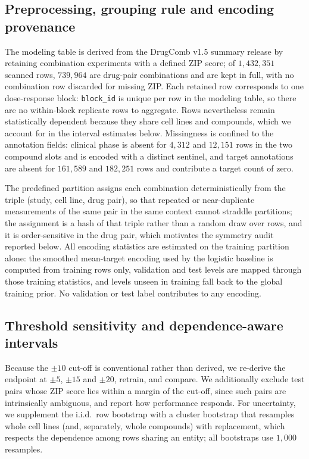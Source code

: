 \documentclass{bmcart}
\begin{document}
\subsection*{Preprocessing, grouping rule and encoding provenance}
The modeling table is derived from the DrugComb v1.5 summary release by retaining combination
experiments with a defined ZIP score; of $1{,}432{,}351$ scanned rows, $739{,}964$ are drug-pair
combinations and are kept in full, with no combination row discarded for missing ZIP. Each retained row
corresponds to one dose-response block: \texttt{block\_id} is unique per row in the modeling table, so
there are no within-block replicate rows to aggregate. Rows nevertheless remain statistically dependent
because they share cell lines and compounds, which we account for in the interval estimates below.
Missingness is confined to the annotation fields: clinical phase is absent for $4{,}312$ and $12{,}151$
rows in the two compound slots and is encoded with a distinct sentinel, and target annotations are
absent for $161{,}589$ and $182{,}251$ rows and contribute a target count of zero.

The predefined partition assigns each combination deterministically from the triple (study, cell line,
drug pair), so that repeated or near-duplicate measurements of the same pair in the same context cannot
straddle partitions; the assignment is a hash of that triple rather than a random draw over rows, and
it is order-sensitive in the drug pair, which motivates the symmetry audit reported below. All encoding
statistics are estimated on the training partition alone: the smoothed mean-target encoding used by the
logistic baseline is computed from training rows only, validation and test levels are mapped through
those training statistics, and levels unseen in training fall back to the global training prior. No
validation or test label contributes to any encoding.

\subsection*{Threshold sensitivity and dependence-aware intervals}
Because the $\pm 10$ cut-off is conventional rather than derived, we re-derive the endpoint at
$\pm 5$, $\pm 15$ and $\pm 20$, retrain, and compare. We additionally exclude test pairs whose ZIP
score lies within a margin of the cut-off, since such pairs are intrinsically ambiguous, and report how
performance responds. For uncertainty, we supplement the i.i.d.\ row bootstrap with a cluster bootstrap
that resamples whole cell lines (and, separately, whole compounds) with replacement, which respects the
dependence among rows sharing an entity; all bootstraps use $1{,}000$ resamples.
\end{document}
